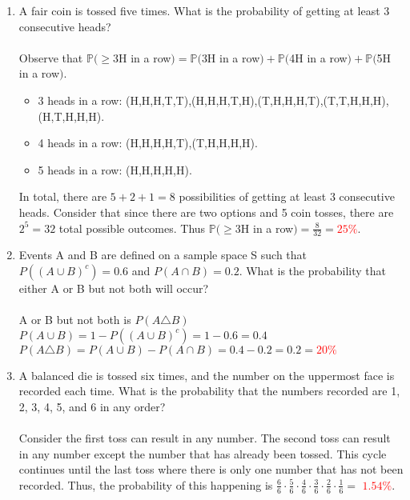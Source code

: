 \documentclass{article}
\newcommand{\union}{\cup}
\newcommand{\intersect}{\cap}
\begin{document}
\begin{enumerate}
\begin{enumerate}
    \end{enumerate}
    \pagebreak
    \item A fair coin is tossed five times. What is the probability of getting at least 3 consecutive heads?\\\\
    Observe that $\mathbb{P}(\geq $3H in a row$) = \mathbb{P}($3H in a row$) + \mathbb{P}($4H in a row$) + \mathbb{P}($5H in a row$)$.
    \begin{itemize}
        \item 3 heads in a row: (H,H,H,T,T),(H,H,H,T,H),(T,H,H,H,T),(T,T,H,H,H),(H,T,H,H,H).
        \item 4 heads in a row: (H,H,H,H,T),(T,H,H,H,H).
        \item 5 heads in a row: (H,H,H,H,H).
    \end{itemize}
    In total, there are $5+2+1=8$ possibilities of getting at least 3 consecutive heads. Consider that since there are two options and 5 coin tosses, there are $2^5=32$ total possible outcomes. Thus $\mathbb{P}(\geq $3H in a row$) = \frac{8}{32}=$\textcolor{red}{$25\%$}.

    \item Events A and B are defined on a sample space S such that $P ((A \union B)^c) = 0.6$ and $P (A \intersect B) = 0.2$. What is the probability that either A or B but not both will occur? \\\\
    A or B but not both is $P(A \triangle B)$ \\
    $P (A \union B) = 1 - P ((A \union B)^c) = 1 - 0.6 = 0.4$\\
    $P(A \triangle B) = P (A \union B) - P (A \intersect B) = 0.4 - 0.2 =0.2=$\textcolor{red}{$20\%$}
    \item  A balanced die is tossed six times, and the number on the uppermost face is recorded each time. What is the probability that the numbers recorded are 1, 2, 3, 4, 5, and 6 in any order? \\\\
    Consider the first toss can result in any number.
    The second toss can result in any number except the number that has already been tossed.
    This cycle continues until the last toss where there is only one number that has not been recorded.
    Thus, the probability of this happening is $\frac{6}{6} \cdot \frac{5}{6} \cdot \frac{4}{6} \cdot \frac{3}{6} \cdot \frac{2}{6} \cdot \frac{1}{6} =$ \textcolor{red}{$1.54\%$}. 
    \end{enumerate}
\end{document}
